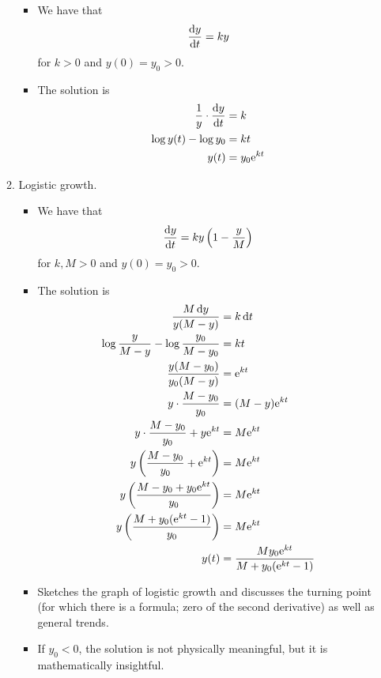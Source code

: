 \documentclass[../notes.tex]{subfiles}
\begin{document}
\begin{itemize}
\begin{enumerate}
        \begin{itemize}
            \item We have that
            \begin{equation*}
                \dv{y}{t} = ky
            \end{equation*}
            for $k>0$ and $y(0)=y_0>0$.
            \item The solution is
            \begin{align*}
                \frac{1}{y}\cdot\dv{y}{t} &= k\\
                \log y(t)-\log y_0 &= kt\\
                y(t) &= y_0\e[kt]
            \end{align*}
        \end{itemize}
        \item Logistic growth.
        \begin{itemize}
            \item We have that
            \begin{equation*}
                \dv{y}{t} = ky\left( 1-\frac{y}{M} \right)
            \end{equation*}
            for $k,M>0$ and $y(0)=y_0>0$.
            \item The solution is
            \begin{align*}
                \frac{M\dd{y}}{y(M-y)} &= k\dd{t}\\
                \log\frac{y}{M-y}-\log\frac{y_0}{M-y_0} &= kt\\
                \frac{y(M-y_0)}{y_0(M-y)} &= \e[kt]\\
                y\cdot\frac{M-y_0}{y_0} &= (M-y)\e[kt]\\
                y\cdot\frac{M-y_0}{y_0}+y\e[kt] &= M\e[kt]\\
                y\left( \frac{M-y_0}{y_0}+\e[kt] \right) &= M\e[kt]\\
                y\left( \frac{M-y_0+y_0\e[kt]}{y_0} \right) &= M\e[kt]\\
                y\left( \frac{M+y_0(\e[kt]-1)}{y_0} \right) &= M\e[kt]\\
                y(t) &= \frac{My_0\e[kt]}{M+y_0(\e[kt]-1)}
            \end{align*}
            \item Sketches the graph of logistic growth and discusses the turning point (for which there is a formula; zero of the second derivative) as well as general trends.
            \item If $y_0<0$, the solution is not physically meaningful, but it is mathematically insightful.

\end{itemize}
\end{enumerate}
\end{itemize}
\end{document}
